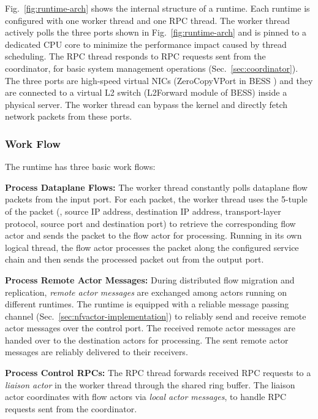 Fig.~\ref{fig:runtime-arch} shows the internal structure of a runtime. Each runtime is configured with one worker thread and one RPC thread. The worker thread actively polls the three ports shown in Fig.~\ref{fig:runtime-arch} and is pinned to a dedicated CPU core to minimize the performance impact caused by thread scheduling. The RPC thread responds to RPC requests sent from the coordinator, for basic system management operations (Sec.~\ref{sec:coordinator}). The three ports are high-speed virtual NICs (ZeroCopyVPort in BESS \cite{bess}) and they are connected to a virtual L2 switch (L2Forward module of BESS) inside a physical server. The worker thread can bypass the kernel and directly fetch network packets from these ports.

\subsubsection{Work Flow}

The runtime has three basic work flows:

\noindent \textbf{Process Dataplane Flows:} The worker thread constantly polls dataplane flow packets from the input port. For each packet, the worker thread uses the 5-tuple of the packet (\ie, source IP address, destination IP address, transport-layer protocol, source port and destination port) to retrieve the corresponding flow actor and sends the packet to the flow actor for processing. Running in its own logical thread, the flow actor processes the packet along the configured service chain and then sends the processed packet out from the output port.

\noindent \textbf{Process Remote Actor Messages:} During distributed flow migration and replication, {\em remote actor messages} are exchanged among actors running on different runtimes. The runtime is equipped with a reliable message passing channel (Sec.~\ref{sec:nfvactor-implementation}) to reliably send and receive remote actor messages over the control port. The received remote actor messages are handed over to the destination actors for processing. The sent remote actor messages are reliably delivered to their receivers.

\noindent \textbf{Process Control RPCs:} The RPC thread forwards received RPC requests to a {\em liaison actor} in the worker thread through the shared ring buffer. The liaison actor coordinates with flow actors via {\em local actor messages}, to handle RPC requests sent from the coordinator.


